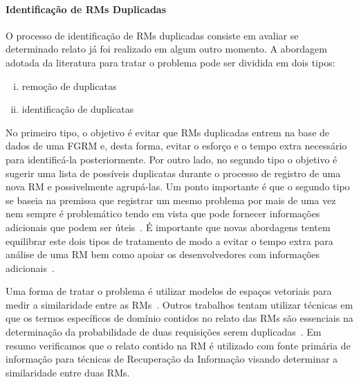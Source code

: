 \paragraph{Identificação de RMs Duplicadas} O processo de identificação de RMs
duplicadas consiste em avaliar se determinado relato já foi realizado em algum
outro momento. A abordagem adotada da literatura para tratar o problema pode ser
dividida em dois tipos\cite{kaushik2012comparative, tian2012improved}:

\begin{enumerate}[(i)]
	\item remoção de duplicatas
	\item identificação de duplicatas
\end{enumerate}

No primeiro tipo, o objetivo é evitar que RMs duplicadas entrem na base de dados
de uma FGRM e, desta forma, evitar o esforço e o tempo extra necessário para
identificá-la posteriormente. Por outro lado, no segundo tipo o objetivo é
sugerir uma lista de possíveis duplicatas durante o processo de registro de uma
nova RM e possivelmente agrupá-las. Um ponto importante é que o segundo tipo se
baseia na premissa que registrar um mesmo problema por mais de uma vez nem
sempre é problemático tendo em vista que pode fornecer informações adicionais
que podem ser úteis~\cite{bettenburg2008duplicate}. É importante que novas
abordagens tentem equilibrar este dois tipos de tratamento de modo a evitar o
tempo extra para análise de uma RM bem como apoiar os desenvolvedores com
informações adicionais~\cite{Lerch:2013:FDY:2495256.2495763,Thung2014}.

Uma forma de tratar o problema é utilizar modelos de espaços vetoriais para
medir a similaridade entre as RMs~\cite{liu2014faceted, sun2010discriminative,
	Thung2014,tomavsev2013exploiting}. Outros trabalhos tentam utilizar técnicas
em que os termos específicos de domínio contidos no relato das RMs são
essenciais na determinação da probabilidade de duas requisições serem
duplicadas~\cite{hindle2016contextual, alipour2013contextual}.  Em resumo
verificamos que o relato contido na RM é utilizado com fonte primária de
informação para técnicas de Re\-cu\-pe\-ra\-ção da Informação visando determinar
a similaridade entre duas RMs.

